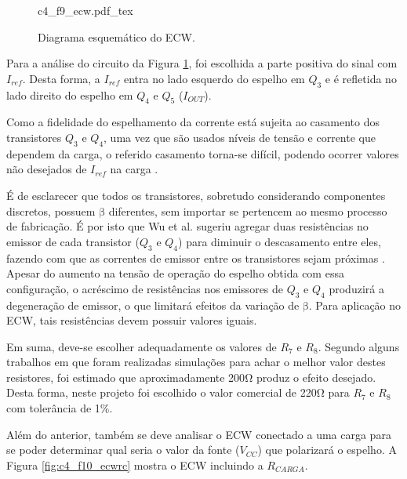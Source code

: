  
\begin{figure}[h]
    \centering %
    \small %
    \def\svgwidth{0.5\columnwidth}%
    {c4_f9_ecw.pdf_tex}
    \caption{Diagrama esquemático do \acrshort{ECW}.}
    \label{fig:c4_f9_ecw}
\end{figure}

Para a análise do circuito da Figura \ref{fig:c4_f9_ecw}, foi escolhida a parte positiva do sinal com $I_{ref}$. Desta forma, a $I_{ref}$ entra no lado esquerdo do espelho em $Q_3$ e é refletida no lado direito do espelho em $Q_4$ e $Q_5$ ($I_{OUT}$).

Como a fidelidade do espelhamento da corrente está sujeita ao casamento dos transistores $Q_3$ e $Q_4$, uma vez que são usados níveis de tensão e corrente que dependem da carga, o referido casamento torna-se difícil, podendo ocorrer valores não desejados de $I_{ref}$ na carga \cite{NacimentoJunqueira2003}.

É de esclarecer que todos os transistores, sobretudo considerando componentes discretos, possuem $\mathrm{\beta}$ diferentes, sem importar se pertencem ao mesmo processo de fabricação. É por isto que Wu et al. sugeriu agregar duas resistências no emissor de cada transistor ($Q_3$ e $Q_4$) para diminuir o descasamento entre eles, fazendo com que as correntes de emissor entre os transistores sejam próximas \cite{Wu2002}. Apesar do aumento na tensão de operação do espelho obtida com essa configuração, o acréscimo de resistências nos emissores de $Q_3$ e $Q_4$ produzirá a degeneração de emissor, o que limitará efeitos da variação de $\mathrm{\beta}$. Para aplicação no \acrshort{ECW}, tais resistências devem possuir valores iguais. 

Em suma, deve-se escolher adequadamente os valores de $R_7$ e $R_8$. Segundo alguns trabalhos \cite{Faria2006, Sanches2013, Wu2002} em que foram realizadas simulações para achar o melhor valor destes resistores, foi estimado que aproximadamente 200$\mathrm{\Omega}$ produz o efeito desejado. Desta forma, neste projeto foi escolhido o valor comercial de 220$\mathrm{\Omega}$ para $R_7$ e $R_8$ com tolerância de 1\%.

Além do anterior, também se deve analisar o \acrshort{ECW} conectado a uma carga para se poder determinar qual seria o valor da fonte ($V_{CC}$) que polarizará o espelho. A Figura \ref{fig:c4_f10_ecwrc} mostra o \acrshort{ECW} incluindo a $R_{CARGA}$.
 
